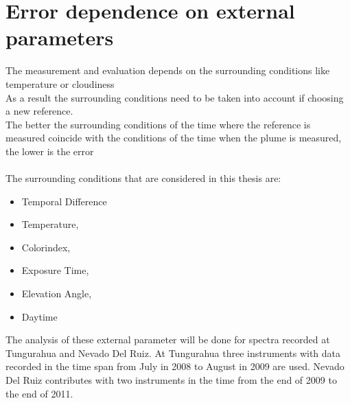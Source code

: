 \documentclass  [
  paper    = a4,
  BCOR     = 10mm,
  twoside,
  fontsize = 12pt,
  fleqn,
  toc      = bibnumbered,
  toc      = listofnumbered,
  numbers  = noendperiod,
  headings = normal,
  listof   = leveldown,
  version  = 3.03
]                                       {scrreprt}
\begin{document}
	\section{ Error dependence on external parameters \label{Chap:BROErr}}
	The measurement and evaluation depends on the surrounding conditions like temperature or cloudiness \citep{lubcke2014optical}\\
	As a result the surrounding conditions need to be taken into account if choosing a new reference.\\
	The better the surrounding conditions of the time where the reference is measured coincide with the conditions of the time when the plume is measured, the lower is the  error \\
	\\

	The surrounding conditions that are considered in this thesis are: 
	\begin{itemize}
		\item Temporal Difference
		\item Temperature, 
		\item Colorindex, 
		\item Exposure Time, 
		\item Elevation Angle, 
		\item Daytime 	
	\end{itemize}
	The analysis of these external parameter will be done for spectra recorded at Tungurahua and Nevado Del Ruiz. At Tungurahua three instruments with data recorded in the time span from July in 2008 to August in 2009 are used. Nevado Del Ruiz contributes with two instruments in the time from the end of 2009 to the end of 2011.
	
	
	
	
\end{document}
